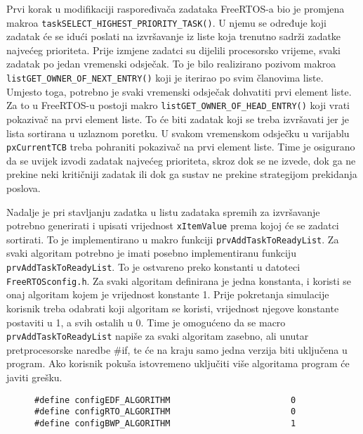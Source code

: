 \documentclass[../zavrsni.tex]{subfiles}
\begin{document}
Prvi korak u modifikaciji raspoređivača zadataka FreeRTOS-a bio je promjena makroa \texttt{taskSELECT\_HIGHEST\_PRIORITY\_TASK()}.
U njemu se određuje koji zadatak će se idući poslati na izvršavanje iz liste koja trenutno sadrži zadatke najvećeg prioriteta.
Prije izmjene zadatci su dijelili procesorsko vrijeme, svaki zadatak po jedan vremenski odsječak. To je bilo realizirano pozivom
makroa \texttt{listGET\_OWNER\_OF\_NEXT\_ENTRY()} koji je iterirao po svim članovima liste. Umjesto toga, potrebno je svaki vremenski odsječak
dohvatiti prvi element liste. Za to u FreeRTOS-u postoji makro \texttt{listGET\_OWNER\_OF\_HEAD\_ENTRY()} koji vrati pokazivač na 
prvi element liste. To će biti zadatak koji se treba izvršavati jer je lista sortirana u uzlaznom poretku. 
U svakom vremenskom odsječku u varijablu \texttt{pxCurrentTCB} treba pohraniti pokazivač na prvi element liste. Time je osigurano da
se uvijek izvodi zadatak najvećeg prioriteta, skroz dok se ne izvede, dok ga ne prekine neki kritičniji zadatak ili dok ga sustav 
ne prekine strategijom prekidanja poslova.


Nadalje je pri stavljanju zadatka u listu zadataka spremih za izvršavanje potrebno generirati i upisati vrijednost \texttt{xItemValue}
prema kojoj će se zadatci sortirati. To je implementirano u makro funkciji \texttt{prvAddTaskToReadyList}. Za svaki algoritam 
potrebno je imati posebno implementiranu funkciju \texttt{prvAddTaskToReadyList}. To je ostvareno preko konstanti u datoteci 
\texttt{FreeRTOSconfig.h}. Za svaki algoritam definirana je jedna konstanta, i koristi se onaj algoritam kojem je vrijednost konstante 1.
Prije pokretanja simulacije korisnik treba odabrati koji algoritam se koristi, vrijednost njegove konstante postaviti u 1, a svih 
ostalih u 0. Time je omogućeno da se macro \texttt{prvAddTaskToReadyList} napiše za svaki algoritam zasebno, ali unutar pretprocesorske
naredbe \#if, te će na kraju samo jedna verzija biti uključena u program. Ako korisnik pokuša istovremeno uključiti više 
algoritama program će javiti grešku.

\begin{figure}[h]
\centering
\begin{lstlisting}[style=CStyle,caption={Primjer uključenja algoritma BWP},captionpos=b]
#define configEDF_ALGORITHM                        0
#define configRTO_ALGORITHM                        0
#define configBWP_ALGORITHM                        1
\end{lstlisting}
\end{figure}
\end{document}
